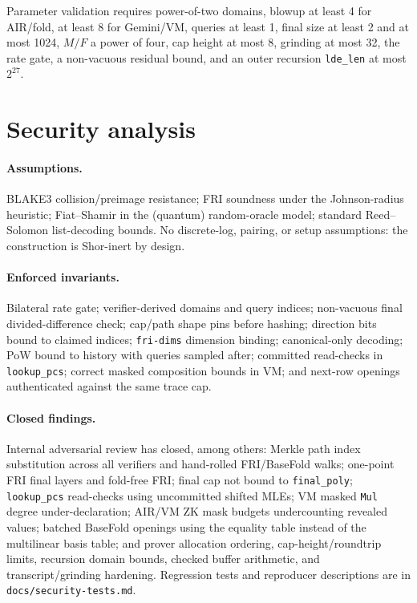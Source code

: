 \documentclass[11pt,a4paper]{article}
\begin{document}
Parameter validation requires power-of-two domains, blowup at least 4 for
AIR/fold, at least 8 for Gemini/VM, queries at least 1, final size at least
2 and at most 1024, $M/F$ a power of four, cap height at most 8, grinding at
most 32, the rate gate, a non-vacuous residual bound, and an outer recursion
\texttt{lde\_len} at most $2^{27}$.

\section{Security analysis}\label{sec:security}

\paragraph{Assumptions.} BLAKE3 collision/preimage resistance; FRI
soundness under the Johnson-radius heuristic; Fiat--Shamir in the (quantum)
random-oracle model; standard Reed--Solomon list-decoding bounds. No
discrete-log, pairing, or setup assumptions: the construction is Shor-inert
by design.

\paragraph{Enforced invariants.} Bilateral rate gate; verifier-derived
domains and query indices; non-vacuous final divided-difference check;
cap/path shape pins before hashing; direction bits bound to claimed indices;
\texttt{fri-dims} dimension binding; canonical-only decoding; PoW bound to
history with queries sampled after; committed read-checks in
\texttt{lookup\_pcs}; correct masked composition bounds in VM; and
next-row openings authenticated against the same trace cap.

\paragraph{Closed findings.} Internal adversarial review has closed, among
others: Merkle path index substitution across all verifiers and hand-rolled
FRI/BaseFold walks; one-point FRI final layers and fold-free FRI; final cap
not bound to \texttt{final\_poly}; \texttt{lookup\_pcs} read-checks using
uncommitted shifted MLEs; VM masked \texttt{Mul} degree under-declaration;
AIR/VM ZK mask budgets undercounting revealed values; batched BaseFold
openings using the equality table instead of the multilinear basis table; and
prover allocation ordering, cap-height/roundtrip limits, recursion domain
bounds, checked buffer arithmetic, and transcript/grinding hardening.
Regression tests and reproducer descriptions are in
\texttt{docs/security-tests.md}.
\end{document}
